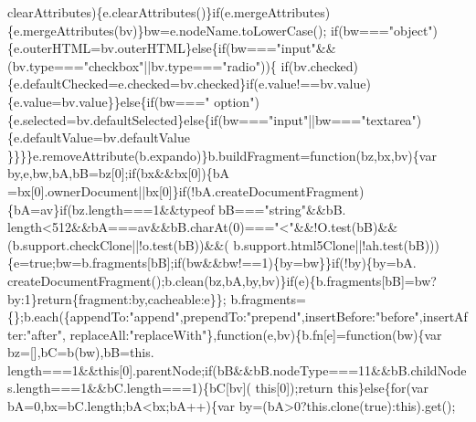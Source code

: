 \begin{DoxyCode}
      clearAttributes)\{e.clearAttributes()\}\textcolor{keywordflow}{if}(e.mergeAttributes)\{e.mergeAttributes(bv)\}bw=e.nodeName.toLowerCase();\textcolor{keywordflow}{
      if}(bw===\textcolor{stringliteral}{"object"})\{e.outerHTML=bv.outerHTML\}\textcolor{keywordflow}{else}\{\textcolor{keywordflow}{if}(bw===\textcolor{stringliteral}{"input"}&&(bv.type===\textcolor{stringliteral}{"checkbox"}||bv.type===\textcolor{stringliteral}{"radio"}))\{\textcolor{keywordflow}{
      if}(bv.checked)\{e.defaultChecked=e.checked=bv.checked\}\textcolor{keywordflow}{if}(e.value!==bv.value)\{e.value=bv.value\}\}\textcolor{keywordflow}{else}\{\textcolor{keywordflow}{if}(bw===\textcolor{stringliteral}{"
      option"})\{e.selected=bv.defaultSelected\}\textcolor{keywordflow}{else}\{\textcolor{keywordflow}{if}(bw===\textcolor{stringliteral}{"input"}||bw===\textcolor{stringliteral}{"textarea"})\{e.defaultValue=bv.defaultValue
      \}\}\}\}e.removeAttribute(b.expando)\}b.buildFragment=\textcolor{keyword}{function}(bz,bx,bv)\{var by,e,bw,bA,bB=bz[0];\textcolor{keywordflow}{if}(bx&&bx[0])\{bA
      =bx[0].ownerDocument||bx[0]\}\textcolor{keywordflow}{if}(!bA.createDocumentFragment)\{bA=av\}\textcolor{keywordflow}{if}(bz.length===1&&typeof bB===\textcolor{stringliteral}{"string"}&&bB.
      length<512&&bA===av&&bB.charAt(0)===\textcolor{stringliteral}{"<"}&&!O.test(bB)&&(b.support.checkClone||!o.test(bB))&&(
      b.support.html5Clone||!ah.test(bB)))\{e=\textcolor{keyword}{true};bw=b.fragments[bB];\textcolor{keywordflow}{if}(bw&&bw!==1)\{by=bw\}\}\textcolor{keywordflow}{if}(!by)\{by=bA.
      createDocumentFragment();b.clean(bz,bA,by,bv)\}\textcolor{keywordflow}{if}(e)\{b.fragments[bB]=bw?by:1\}\textcolor{keywordflow}{return}\{fragment:by,cacheable:e\}\};
      b.fragments=\{\};b.each(\{appendTo:\textcolor{stringliteral}{"append"},prependTo:\textcolor{stringliteral}{"prepend"},insertBefore:\textcolor{stringliteral}{"before"},insertAfter:\textcolor{stringliteral}{"after"},
      replaceAll:\textcolor{stringliteral}{"replaceWith"}\},\textcolor{keyword}{function}(e,bv)\{b.fn[e]=\textcolor{keyword}{function}(bw)\{var bz=[],bC=b(bw),bB=this.
      length===1&&\textcolor{keyword}{this}[0].parentNode;\textcolor{keywordflow}{if}(bB&&bB.nodeType===11&&bB.childNodes.length===1&&bC.length===1)\{bC[bv](\textcolor{keyword}{
      this}[0]);\textcolor{keywordflow}{return} \textcolor{keyword}{this}\}\textcolor{keywordflow}{else}\{\textcolor{keywordflow}{for}(var bA=0,bx=bC.length;bA<bx;bA++)\{var by=(bA>0?this.clone(\textcolor{keyword}{true}):\textcolor{keyword}{this}).\textcolor{keyword}{get}();

\end{DoxyCode}
